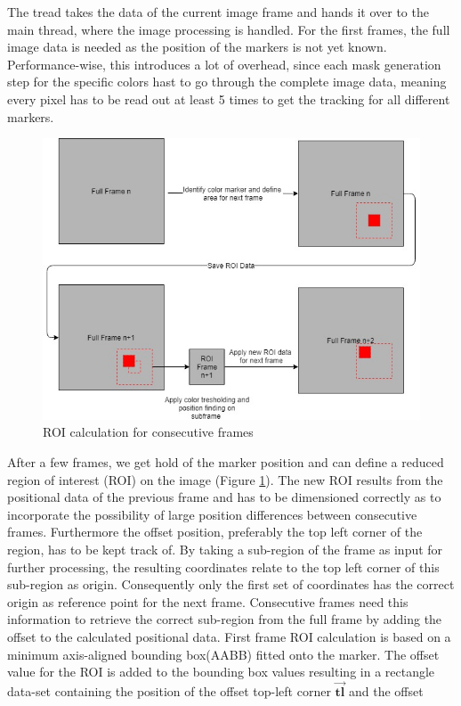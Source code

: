 The tread takes the data of the current image frame and hands it over to the main thread, where the image processing is handled. For the first frames, the full image data is needed as the position of the markers is not yet known. Performance-wise, this introduces a lot of overhead, since each mask generation step for the specific colors hast to go through the complete image data, meaning every pixel has to be read out at least 5 times to get the tracking for all different markers.
\begin{figure}[H]
\includegraphics[width=\textwidth]{images/ROI.jpg}
\caption{ROI calculation for consecutive frames}
\label{roi_calc} 
\end{figure}
After a few frames, we get hold of the marker position and can define a reduced region of interest (ROI) on the image (Figure \ref{roi_calc}). The new ROI results from the positional data of the previous frame and has to be dimensioned correctly as to incorporate the possibility of large position differences between consecutive frames.
Furthermore the offset position, preferably the top left corner of the region, has to be kept track of. By taking a sub-region of the frame as input for further processing, the resulting coordinates relate to the top left corner of this sub-region as origin. Consequently only the first set of coordinates has the correct origin as reference point for the next frame. Consecutive frames need this information to retrieve the correct sub-region from the full frame by adding the offset to the calculated positional data.
First frame ROI calculation is based on a minimum axis-aligned bounding box(AABB) fitted onto the marker. The offset value for the ROI is added to the bounding box values resulting in a rectangle data-set containing the position of the offset top-left corner $\vec{\mathbf{tl}}$ and the offset 
